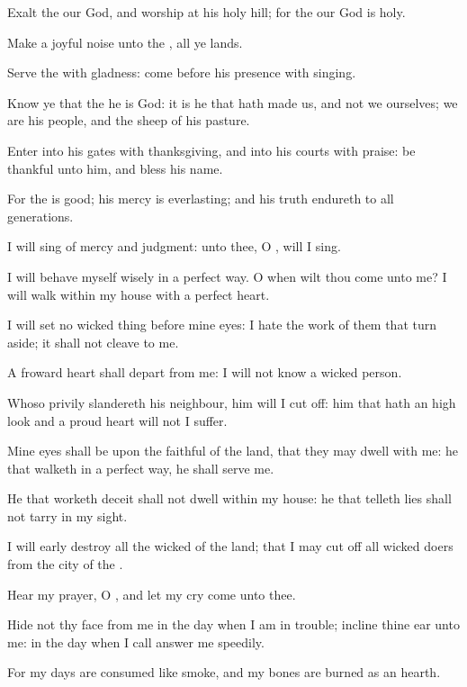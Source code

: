 \Verse Exalt the \LORD our God, and worship at his holy hill; for the \LORD our God is holy.




\Chapter
\Verse Make a joyful noise unto the \LORD, all ye lands.

\Verse Serve the \LORD with gladness: come before his presence with singing.

\Verse Know ye that the \LORD he is God: it is he that hath made us, and not we ourselves; we are his people, and the sheep of his pasture.

\Verse Enter into his gates with thanksgiving, and into his courts with praise: be thankful unto him, and bless his name.

\Verse For the \LORD is good; his mercy is everlasting; and his truth endureth to all generations.




\Chapter
\Verse I will sing of mercy and judgment: unto thee, O \LORD, will I sing.

\Verse I will behave myself wisely in a perfect way. O when wilt thou come unto me? I will walk within my house with a perfect heart.

\Verse I will set no wicked thing before mine eyes: I hate the work of them that turn aside; it shall not cleave to me.

\Verse A froward heart shall depart from me: I will not know a wicked person.

\Verse Whoso privily slandereth his neighbour, him will I cut off: him that hath an high look and a proud heart will not I suffer.

\Verse Mine eyes shall be upon the faithful of the land, that they may dwell with me: he that walketh in a perfect way, he shall serve me.

\Verse He that worketh deceit shall not dwell within my house: he that telleth lies shall not tarry in my sight.

\Verse I will early destroy all the wicked of the land; that I may cut off all wicked doers from the city of the \LORD.




\Chapter
\Verse Hear my prayer, O \LORD, and let my cry come unto thee.

\Verse Hide not thy face from me in the day when I am in trouble; incline thine ear unto me: in the day when I call answer me speedily.

\Verse For my days are consumed like smoke, and my bones are burned as an hearth.

